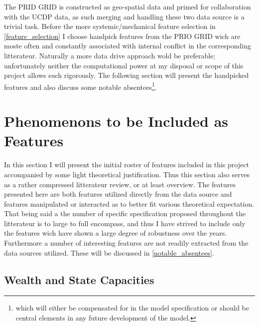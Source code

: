 \documentclass[a4paper]{article}
\begin{document}
The PRID GRID is constructed as geo-spatial data and primed for collaboration with the UCDP data, as such merging and handling these two data source is a trivial task. Before the more systemic/mechanical feature selection in \autoref{feature_selection} I choose handpick features from the PRIO GRID wich are moste often and constantly associated with internal conflict in the corresponding litterateur. Naturally a more data drive approach wold be preferable; unfortunately neither the computational power at my disposal or scope of this project allows such rigorously. The following section will present the handpicked features and also discuss some notable absentees\footnote{which will either be compensated for in the model specification or should be central elements in any future development of the model.}.\par

\section{Phenomenons to be Included as Features}


In this section I will present the initial roster of features included in this project accompanied by some light theoretical justification. Thus this section also serves as a rather compressed litterateur review, or at least overview. The features presented here are both features utilized directly from the data source and features manipulated or interacted as to better fit various theoretical expectation. That being said a the number of specific specification proposed throughout the litterateur is to large to full encompass, and thus I have strived to include only the features wich have shown a large degree of robustness over the years. Furthermore a number of interesting features are not readily extracted from the data sources utilized. These will be discussed in \autoref{notable_absentees}.


\subsection{Wealth and State Capacities} %
\end{document}
